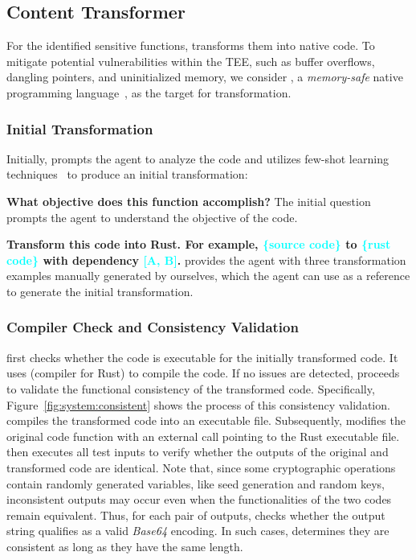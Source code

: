 \subsection{Content Transformer}
For the identified sensitive functions, \system transforms them into native code.
To mitigate potential vulnerabilities within the TEE, such as buffer overflows, dangling pointers, and uninitialized memory, we consider , a \emph{memory-safe} native programming language~\cite{wang2019towards,Wan3427262}, as the target for transformation.

\subsubsection{Initial Transformation}\label{subsub:initial_transformation}
Initially, \system prompts the agent to analyze the code and utilizes few-shot learning techniques~\cite{snell2017prototypical} to produce an initial transformation:

\begin{description}[leftmargin = 0pt]
    \item [Prompt 1:] \textbf{What objective does this function accomplish?}
    The initial question prompts the agent to understand the objective of the code.

    \item [Prompt 2:] \textbf{Transform this code into Rust. 
    For example, \textcolor{cyan}{\{source code\}} to \textcolor{cyan}{\{rust code\}} with dependency \textcolor{cyan}{[A, B]}.}
    \system provides the agent with three transformation examples manually generated by ourselves, which the agent can use as a reference to generate the initial transformation.
\end{description}

\subsubsection{Compiler Check and Consistency Validation}
\label{subsubsec:check_validate}
\system first checks whether the code is executable for the initially transformed code.
It uses  (compiler for Rust) to compile the code.
If no issues are detected, \system proceeds to validate the functional consistency of the transformed code.
Specifically, Figure~\ref{fig:system:consistent} shows the process of this consistency validation.
\system compiles the transformed code into an executable file.
Subsequently, \system modifies the original code function with an external call pointing to the Rust executable file.
\system then executes all test inputs to verify whether the outputs of the original and transformed code are identical. 
Note that, since some cryptographic operations contain randomly generated variables, like seed generation and random keys, inconsistent outputs may occur even when the functionalities of the two codes remain equivalent.
Thus, for each pair of outputs, \system checks whether the output string qualifies as a valid \emph{Base64} encoding.
In such cases, \system determines they are consistent as long as they have the same length.

